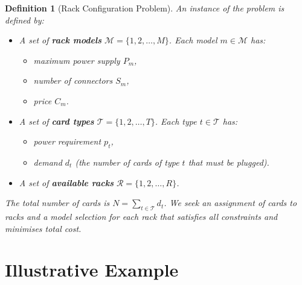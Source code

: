 \documentclass[11pt,a4paper]{article}
\newtheorem{definition}{Definition}
\newcommand{\setR}{\mathcal{R}}
\newcommand{\setM}{\mathcal{M}}
\newcommand{\setT}{\mathcal{T}}
\begin{document}
\begin{definition}[Rack Configuration Problem]
An instance of the problem is defined by:
\begin{itemize}
  \item A set of \textbf{rack models}
        $\setM = \{1, 2, \dots, M\}$.
        Each model $m \in \setM$ has:
        \begin{itemize}
          \item maximum power supply $P_m$,
          \item number of connectors $S_m$,
          \item price $C_m$.
        \end{itemize}
  \item A set of \textbf{card types}
        $\setT = \{1, 2, \dots, T\}$.
        Each type $t \in \setT$ has:
        \begin{itemize}
          \item power requirement $p_t$,
          \item demand $d_t$ (the number of cards of type $t$
                that must be plugged).
        \end{itemize}
  \item A set of \textbf{available racks}
        $\setR = \{1, 2, \dots, R\}$.
\end{itemize}
The total number of cards is $N = \sum_{t \in \setT} d_t$.
We seek an assignment of cards to racks and a model selection for each
rack that satisfies all constraints and minimises total cost.
\end{definition}

\section{Illustrative Example}
\label{sec:example}
\end{document}
